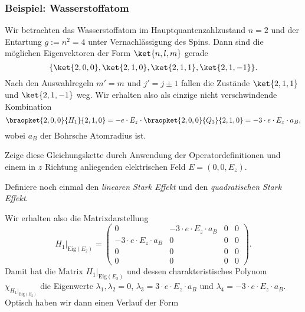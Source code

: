 \documentclass{subfiles}
\begin{document}
        \subsubsection*{Beispiel: Wasserstoffatom}
            Wir betrachten das Wasserstoffatom im Hauptquantenzahlzustand $n = 2$ und der Entartung $g:= n^2 = 4$ unter Vernachlässigung des Spins. Dann sind die möglichen Eigenvektoren der Form $\ket{n,l,m}$ gerade
            \[
                \{\ket{2,0,0},\ket{2,1,0},\ket{2,1,1},\ket{2,1,-1}\}.
            \]
            Nach den Auswahlregeln $m'=m$ und $j' = j \pm 1$ fallen die Zustände $\ket{2,1,1}$ und $\ket{2,1,-1}$ weg. Wir erhalten also als einzige nicht verschwindende Kombination 
            \[
                \braopket{2,0,0}{H_1}{2,1,0} = -e\cdot E_z\cdot \braopket{2,0,0}{Q_3}{2,1,0} = -3\cdot e\cdot E_z\cdot a_B,
            \]
            wobei $a_B$ der Bohrsche Atomradius ist. 
            \begin{Aufgabe}
                \nr{} Zeige diese Gleichungskette durch Anwendung der Operatordefinitionen und einem in $z$ Richtung anliegenden elektrischen Feld $E = (0,0,E_z)$.

                \nr{} Definiere noch einmal den \emph{linearen Stark Effekt} und den \emph{quadratischen Stark Effekt}.
            \end{Aufgabe}
            \noindent Wir erhalten also die Matrixdarstellung
            \[
                H_1|_{\text{Eig}(E_2)} = \begin{pmatrix}
                    0 & -3\cdot e\cdot E_z\cdot a_B & 0 & 0 \\
                    -3\cdot e\cdot E_z\cdot a_B & 0 & 0 & 0 \\
                    0 & 0 & 0 & 0 \\
                    0 & 0 & 0 & 0
                \end{pmatrix}.
            \]
            Damit hat die Matrix $H_1|_{\text{Eig}(E_2)}$ und dessen charakteristisches Polynom $\chi_{H_1|_{\text{Eig}(E_2)}}$ die Eigenwerte $\lambda_1,\lambda_2 = 0$, $\lambda_3 = 3\cdot e\cdot E_z\cdot a_B$ und $\lambda_4 = -3\cdot e\cdot E_z\cdot a_B$. Optisch haben wir dann einen Verlauf der Form 
            \begin{figure}[H]
                \centering
            \end{figure}
\end{document}
